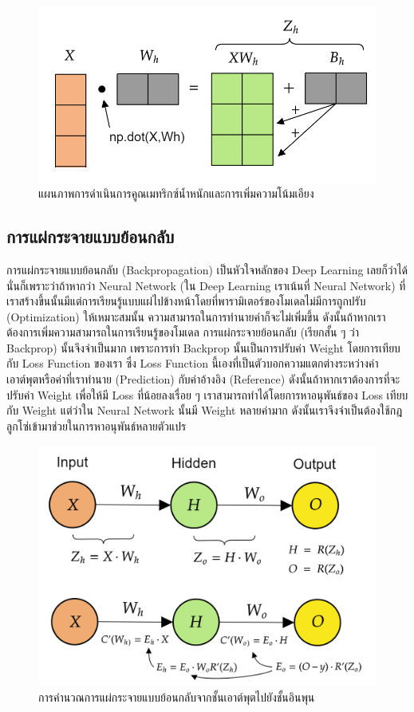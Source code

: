 \begin{figure}[H]
    \centering
    \includegraphics[width=0.8\linewidth]{fig/nn_feedforward_matrix_weighted_input.png}
    \caption{แผนภาพการดำเนินการคูณเมทริกซ์น้ำหนักและการเพิ่มความโน้มเอียง}
    \label{fig:nn_ff_mat_w}
\end{figure}

\subsection{การแผ่กระจายแบบย้อนกลับ}
\label{ssec:backprop}

การแผ่กระจายแบบย้อนกลับ (Backpropagation) เป็นหัวใจหลักของ Deep Learning เลยก็ว่าได้ นั่นก็เพราะว่าถ้าหากว่า Neural Network 
(ใน Deep Learning เราเน้นที่ Neural Network) ที่เราสร้างขึ้นนั้นมีแต่การเรียนรู้แบบแผ่ไปข้างหน้าโดยที่พารามิเตอร์ของโมเดลไม่มีการถูกปรับ
(Optimization) ให้เหมาะสมนั้น ความสามารถในการทำนายค่าก็จะไม่เพิ่มขึ้น ดังนั้นถ้าหากเราต้องการเพิ่มความสามารถในการเรียนรู้ของโมเดล 
การแผ่กระจายย้อนกลับ (เรียกสั้น ๆ ว่า Backprop) นั้นจึงจำเป็นมาก เพราะการทำ Backprop นั้นเป็นการปรับค่า Weight โดยการเทียบกับ Loss
Function ของเรา ซึ่ง Loss Function นี้เองที่เป็นตัวบอกความแตกต่างระหว่างค่าเอาต์พุตหรือค่าที่เราทำนาย (Prediction) กับค่าอ้างอิง 
(Reference) ดังนั้นถ้าหากเราต้องการที่จะปรับค่า Weight เพื่อให้มี Loss ที่น้อยลงเรื่อย ๆ เราสามารถทำได้โดยการหาอนุพันธ์ของ Loss 
เทียบกับ Weight แต่ว่าใน Neural Network นั้นมี Weight หลายค่ามาก ดังนั้นเราจึงจำเป็นต้องใช้กฎลูกโซ่เข้ามาช่วยในการหาอนุพันธ์หลายตัวแปร

\begin{figure}[H]
    \centering
    \includegraphics[width=0.8\linewidth]{fig/nn_backprop.png}
    \caption{การคำนวณการแผ่กระจายแบบย้อนกลับจากชั้นเอาต์พุตไปยังชั้นอินพุน}
    \label{fig:nn_bp}
\end{figure}

